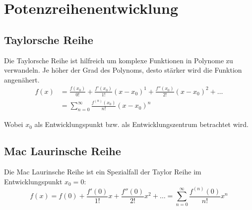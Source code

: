\section{Potenzreihenentwicklung}
\subsection{Taylorsche Reihe}
Die Taylorsche Reihe ist hilfreich um komplexe Funktionen in Polynome zu verwandeln. Je höher der Grad des Polynoms, desto stärker wird die Funktion angenähert.
\begin{align*}
	f(x)& = \frac{f(x_0)}{0!} + \frac{f'(x_0)}{1!}(x - x_0)^1 + \frac{f''(x_0)}{2!} (x - x_0)^2 +  \dots\\
	& = \sum_{n=0}^\infty \frac{f^{(n)} (x_0)}{n!} (x - x_0)^n
\end{align*}

Wobei $x_0$ als Entwicklungspunkt bzw. als Entwicklungszentrum betrachtet wird.

\subsection{Mac Laurinsche Reihe}
Die Mac Laurinsche Reihe ist ein Spezialfall der Taylor Reihe im Entwicklungspunkt $x_0 = 0$:
\begin{equation*}
	f(x) = f(0) + \frac{f'(0)}{1!} x + \frac{f''(0)}{2!} x^2 + \dots = \sum_{n=0}^\infty \frac{f^{(n)}(0)}{n!} x^n
\end{equation*}


